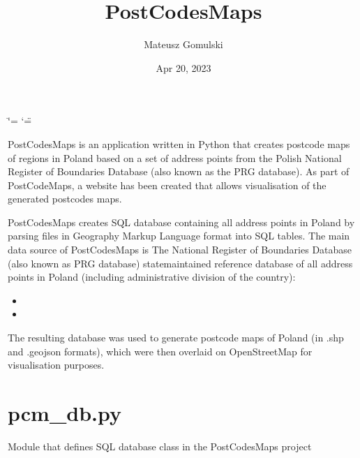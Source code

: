 \documentclass[letterpaper,10pt,english]{sphinxmanual}
\title{PostCodesMaps}
\date{Apr 20, 2023}
\author{Mateusz Gomulski}
\begin{document}
\ifdefined\shorthandoff
  \ifnum\catcode`\=\string=\active\shorthandoff{=}\fi
  \ifnum\catcode`\"=\active{}\fi
\fi

\pagestyle{empty}
\sphinxmaketitle
\pagestyle{plain}
\sphinxtableofcontents
\pagestyle{normal}
\label{\detokenize{index::doc}}


\sphinxAtStartPar
PostCodesMaps is an application written in Python that creates postcode maps of regions in Poland based on a set of address points from the Polish National Register of Boundaries Database (also known as the PRG database). As part of PostCodeMaps, a website has been created that allows visualisation of the generated postcodes maps.

\sphinxAtStartPar
PostCodesMaps creates SQL database containing all address points in Poland by parsing files in Geography Markup Language format into SQL tables. The main data source of PostCodesMaps is The National Register of Boundaries Database (also known as PRG database) \sphinxhyphen{} state\sphinxhyphen{}maintained reference database of all address points in Poland (including administrative division of the country):
\begin{itemize}
\item {} 
\sphinxAtStartPar
{}

\item {} 
\sphinxAtStartPar
{}

\end{itemize}

\sphinxAtStartPar
The resulting database was used to generate postcode maps of Poland (in .shp and .geojson formats), which were then overlaid on OpenStreetMap for visualisation purposes.

\sphinxstepscope


\chapter{pcm\_db.py}
\label{\detokenize{pcm_db:module-pcm_db}}\label{\detokenize{pcm_db:pcm-db-py}}\label{\detokenize{pcm_db::doc}}
\sphinxAtStartPar
Module that defines SQL database class in the PostCodesMaps project
\end{document}
